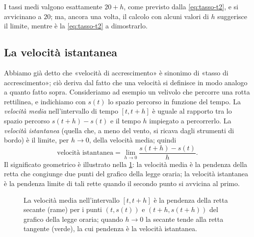 I tassi medi valgono esattamente $20+h$, come previsto dalla \eqref{eq:tasso-t2}, e si
avvicinano a $20$; ma, ancora una volta, il calcolo con alcuni valori di $h$ suggerisce
il limite, mentre è la \eqref{eq:tasso-t2} a dimostrarlo.

\subsection{La velocità istantanea}

Abbiamo già detto che «velocità di accrescimento» è sinonimo di «tasso di
accrescimento»; ciò deriva dal fatto che una velocità si definisce in modo analogo a
quanto fatto sopra. Consideriamo ad esempio un velivolo che percorre una rotta
rettilinea, e indichiamo con $s(t)$ lo spazio percorso in funzione del tempo. La
\emph{velocità media} nell'intervallo di tempo $[t,t+h]$ è uguale al rapporto tra lo
spazio percorso $s(t+h)-s(t)$ e il tempo $h$ impiegato a percorrerlo. La \emph{velocità
istantanea} (quella che, a meno del vento, si ricava dagli strumenti di bordo) è il
limite, per $h\to0$, della velocità media; quindi
\begin{equation}\label{eq:velocita-istantanea}
  \text{velocità istantanea}=\lim_{h\to0}\frac{s(t+h)-s(t)}{h}.
\end{equation}
Il significato geometrico è illustrato nella \cref{fig:velocita-media}: la velocità media
è la pendenza della retta che congiunge due punti del grafico della legge oraria; la
velocità istantanea è la pendenza limite di tali rette quando il secondo punto si
avvicina al primo.

\begin{figure}[htb]
\centering
{}
\caption{La velocità media nell'intervallo $[t,t+h]$ è la pendenza della retta secante
(rame) per i punti $(t,s(t))$ e $(t+h,s(t+h))$ del grafico della legge oraria; quando
$h\to0$ la secante tende alla retta tangente (verde), la cui pendenza è la velocità
istantanea.}
\label{fig:velocita-media}
\end{figure}


